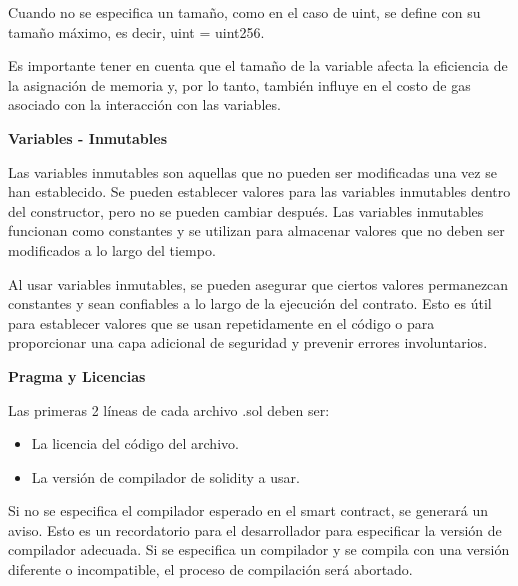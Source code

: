 \bigskip

Cuando no se especifica un tamaño, como en el caso de uint, se define con su tamaño máximo, es decir, uint = uint256.

\bigskip

Es importante tener en cuenta que el tamaño de la variable afecta la eficiencia de la asignación de memoria y, por lo tanto, también influye en el costo de gas asociado con la interacción con las variables.

\bigskip



\newpage

\bigskip

\textbf{Variables - Inmutables}

\bigskip

Las variables inmutables son aquellas que no pueden ser modificadas una vez se han establecido. Se pueden establecer valores para las variables inmutables dentro del constructor, pero no se pueden cambiar después. Las variables inmutables funcionan como constantes y se utilizan para almacenar valores que no deben ser modificados a lo largo del tiempo.

\bigskip

Al usar variables inmutables, se pueden asegurar que ciertos valores permanezcan constantes y sean confiables a lo largo de la ejecución del contrato. Esto es útil para establecer valores que se usan repetidamente en el código o para proporcionar una capa adicional de seguridad y prevenir errores involuntarios.

\bigskip



\bigskip

\textbf{Pragma y Licencias}

\bigskip

Las primeras 2 líneas de cada archivo .sol deben ser:

\begin{itemize}
    \item La licencia del código del archivo.
    \item La versión de compilador de solidity a usar.
\end{itemize}

Si no se especifica el compilador esperado en el smart contract, se generará un aviso. Esto es un recordatorio para el desarrollador para especificar la versión de compilador adecuada. Si se especifica un compilador y se compila con una versión diferente o incompatible, el proceso de compilación será abortado.

